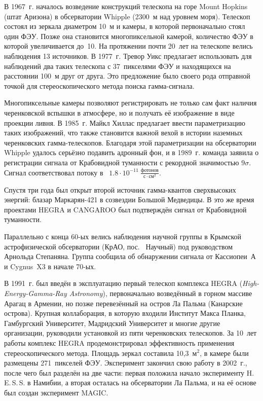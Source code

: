 \documentclass[magd,floatypics,numeref]{msudipl} %
\begin{document}
В 1967~г. началось возведение конструкций телескопа на горе Mount Hopkins (штат Аризона) в обсерватории Whipple (2300~м над уровнем моря). Телескоп состоял из зеркала диаметром 10~м и камеры, в которой первоначально стоял один ФЭУ. Позже она становится многопиксельной камерой, количество ФЭУ в которой увеличивается до~10. На протяжении почти 20~лет на телескопе велись наблюдения 13 источников. В 1977~г. Тревор Уикс предлагает использовать для наблюдений два таких телескопа с 37~пикселями ФЭУ и находящихся на расстоянии 100~м друг от друга. Это предложение было своего рода отправной точкой для стереоскопического метода поиска гамма-сигнала. 

Многопиксельные камеры позволяют регистрировать не только сам факт наличия черенковской вспышки в атмосфере, но и получать её изображение в виде проекции ливня. В 1985~г. Майкл Хиллас предлагает ввести параметризацию таких изображений, что также становится важной вехой в истории наземных черенковских гамма-телескопов. Благодаря этой параметризации на обсерватории Whipple удалось серьёзно подавить адронный фон, и в 1989~г. команда заявила о регистрации сигнала от Крабовидной туманности с рекордной значимостью $9\sigma$. Сигнал соответствовал потоку в~ $1.8\cdot10^{-11}~\frac{\text{фотонов}}{\text{с}\cdot\text{см}^2}$. 

Спустя три года был открыт второй источник гамма-квантов сверхвысоких энергий: блазар Маркарян-421 в созвездии Большой Медведицы. В это же время проектами HEGRA и CANGAROO был подтверждён сигнал от Крабовидной туманности.

Параллельно с конца 60-ых велись наблюдения научной группы в Крымской астрофизической обсерватории (КрАО, пос.~ Научный) под руководством Арнольда Степаняна.  Группа сообщила об обнаружении сигнала от Кассиопеи~А и Cygnus~X3 в начале 70-ых. 

В 1991~г. был введён в эксплуатацию первый телескоп комплекса HEGRA (\textit{High-Energy-Gamma-Ray Astronomy}), первоначально возведённый в горном массиве Арагац в Армении, но позже перевезённый на остров Ла Пальма (Канарские острова). Крупная коллаборация, в которую входили Институт Макса Планка, Гамбургский Университет, Мадридский Университет и многие другие организации, руководили установкой из пяти черенковских телескопов. За 10~лет работы комплекс HEGRA продемонстрировал эффективность применения стереоскопического метода. Площадь зеркал составила 10,3~$\text{м}^2$, в камере были размещены 271~пикселей ФЭУ. Эксперимент закончил свою работу в 2002~г., после чего был разделён на две части: первая положила начало эксперименту H.\,E.\,S.\,S. в Намибии, а вторая осталась на обсерватории Ла Пальма, и на её основе был создан эксперимент MAGIC. 
\end{document}
